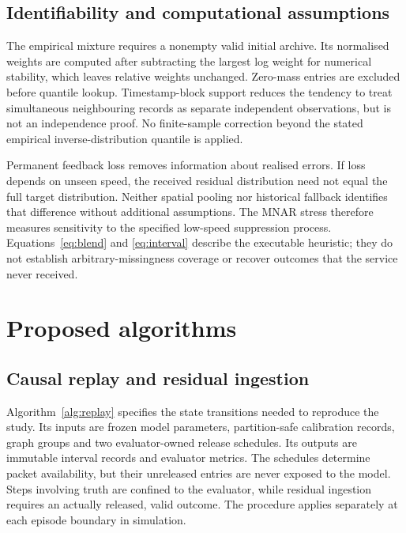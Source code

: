 \documentclass[pdflatex,sn-mathphys-num]{sn-jnl}
\newcounter{algorithm}
\begin{document}
\subsection{Identifiability and computational assumptions}
The empirical mixture requires a nonempty valid initial archive. Its normalised weights are computed after subtracting the largest log weight for numerical stability, which leaves relative weights unchanged. Zero-mass entries are excluded before quantile lookup. Timestamp-block support reduces the tendency to treat simultaneous neighbouring records as separate independent observations, but is not an independence proof. No finite-sample correction beyond the stated empirical inverse-distribution quantile is applied.

Permanent feedback loss removes information about realised errors. If loss depends on unseen speed, the received residual distribution need not equal the full target distribution. Neither spatial pooling nor historical fallback identifies that difference without additional assumptions. The MNAR stress therefore measures sensitivity to the specified low-speed suppression process. Equations~\eqref{eq:blend} and \eqref{eq:interval} describe the executable heuristic; they do not establish arbitrary-missingness coverage or recover outcomes that the service never received.

\section{Proposed algorithms}\label{sec:algorithm}
\subsection{Causal replay and residual ingestion}
Algorithm~\ref{alg:replay} specifies the state transitions needed to reproduce the study. Its inputs are frozen model parameters, partition-safe calibration records, graph groups and two evaluator-owned release schedules. Its outputs are immutable interval records and evaluator metrics. The schedules determine packet availability, but their unreleased entries are never exposed to the model. Steps involving truth are confined to the evaluator, while residual ingestion requires an actually released, valid outcome. The procedure applies separately at each episode boundary in simulation.
\end{document}

